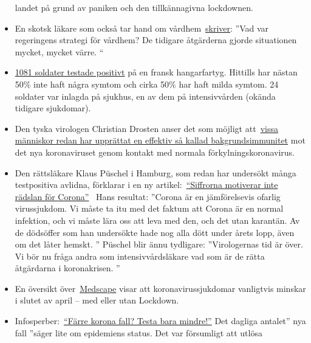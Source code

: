 \begin{itemize}
  landet på grund av paniken och den tillkännagivna lockdownen.
\item
  En skotsk läkare som också tar hand om
  vårdhem~\href{https://drmalcolmkendrick.org/2020/04/17/care-homes-and-covid19/}{skriver}:
  ''Vad var regeringens strategi för vårdhem? De tidigare åtgärderna
  gjorde situationen mycket, mycket värre. ``
\item
  \href{https://www.ouest-france.fr/sante/virus/coronavirus/coronavirus-au-moins-940-marins-positifs-sur-le-charles-de-gaulle-et-son-escorte-6810816}{1081
  soldater testade positivt} på en fransk hangarfartyg. Hittills har
  nästan 50\% inte haft några symtom och cirka 50\% har haft milda
  symtom. 24 soldater var inlagda på sjukhus, en av dem på
  intensivvården (okända tidigare sjukdomar).
\item
  Den tyska virologen Christian Drosten anser det som möjligt
  att~\href{https://www.watson.de/!324026684}{vissa människor redan har
  upprättat en effektiv så kallad bakgrundsimmunitet} mot det nya
  koronaviruset genom kontakt med normala förkylningskoronavirus.
\item
  Den rättsläkare Klaus Püschel i Hamburg, som redan har undersökt många
  testpositiva avlidna, förklarar i en ny
  artikel:~\href{https://www.abendblatt.de/hamburg/article228908865/hamburg-corona-virus-uke-infektion-covid-19-pueschel-coronavirus-krise-patienten-impfstoff-immunitaet-krankenhaeuser-kontaktverbot-kliniken-infektionsrate-krankheit-pandemie-test-lungenkrankheit-sars-cov-epidemie-sars-cov-2.html}{``Siffrorna
  motiverar inte rädslan för Corona''}~ Hans resultat: ''Corona är en
  jämförelsevis ofarlig virussjukdom. Vi måste ta itu med det faktum att
  Corona är en normal infektion, och vi måste lära oss att leva med den,
  och det utan karantän. Av de dödsöffer som han undersökte hade nog
  alla dött under årets lopp, även om det låter hemskt. '' Püschel blir
  ännu tydligare: ''Virologernas tid är över. Vi bör nu fråga andra som
  intensivvårdsläkare vad som är de rätta åtgärdarna i koronakrisen. ''
\item
  En översikt
  över~\href{https://emedicine.medscape.com/article/227820-overview}{Medscape}
  visar att koronavirussjukdomar vanligtvis minskar i slutet av april --
  med eller utan Lockdown.
\item
  Infosperber:~\href{https://www.infosperber.ch/Artikel/Gesundheit/Weniger-Corona-Falle-Einfach-weniger-testen}{``Färre
  korona fall? Testa bara mindre!''} Det dagliga antalet'' nya fall
  ''säger lite om epidemiens status. Det var försumligt att utlösa

\end{itemize}
